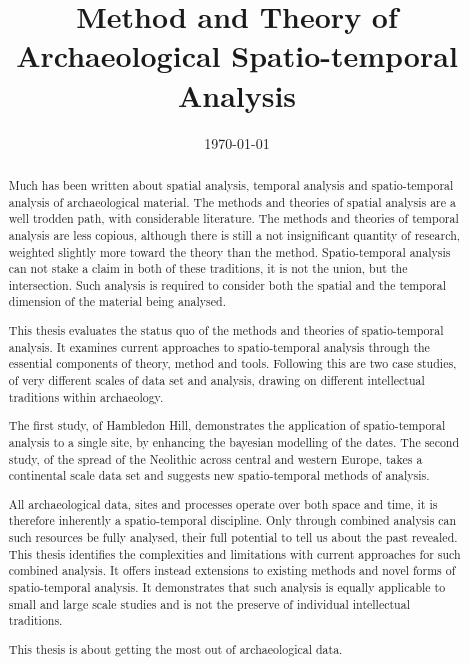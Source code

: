 \documentclass{ecsthesis}
\begin{document}
\frontmatter
\title      {Method and Theory of Archaeological Spatio-temporal Analysis}
\addresses  {\groupname\\\deptname\\\univname}
\date       {\today}
\subject    {}
\keywords   {}
\maketitle
\begin{abstract}
\begin{singlespacing}
Much has been written about spatial analysis, temporal analysis and spatio-temporal analysis of archaeological material. The methods and theories of spatial analysis are a well trodden path, with considerable literature. The methods and theories of temporal analysis are less copious, although there is still a not insignificant quantity of research, weighted slightly more toward the theory than the method. Spatio-temporal analysis can not stake a claim in both of these traditions, it is not the union, but the intersection. Such analysis is required to consider both the spatial and the temporal dimension of the material being analysed.

This thesis evaluates the status quo of the methods and theories of spatio-temporal analysis. It examines current approaches to spatio-temporal analysis through the essential components of theory, method and tools. Following this are two case studies, of very different scales of data set and  analysis, drawing on different intellectual traditions within archaeology. 

The first study, of Hambledon Hill, demonstrates the application of spatio-temporal analysis to a single site, by enhancing the bayesian modelling of the dates. The second study, of the spread of the Neolithic across central and western Europe, takes a continental scale data set and suggests new spatio-temporal methods of analysis.

All archaeological data, sites and processes operate over both space and time, it is therefore inherently a spatio-temporal discipline. Only through combined analysis can such resources be fully analysed, their full potential to tell us about the past revealed. This thesis identifies the complexities and limitations with current approaches for such combined analysis. It offers instead extensions to existing methods and novel forms of spatio-temporal analysis. It demonstrates that such analysis is equally applicable to small and large scale studies and is not the preserve of individual intellectual traditions.

This thesis is about getting the most out of archaeological data. 
\end{singlespacing}
\end{abstract}
\end{document}

